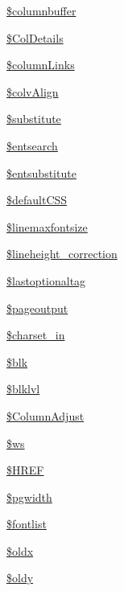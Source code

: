 \begin{DoxyCompactItemize}
\hyperlink{classm_p_d_f_aabfc100308c40e12ebfdd24c4d60b424}{\$columnbuffer}
\item 
\hyperlink{classm_p_d_f_aeceaca485aaacc2226164eaa7629f0f0}{\$\-Col\-Details}
\item 
\hyperlink{classm_p_d_f_abc960dbe6def3255555b6f5072913ca0}{\$column\-Links}
\item 
\hyperlink{classm_p_d_f_a6cedada26bd3250dc7f8cb423c334ad8}{\$colv\-Align}
\item 
\hyperlink{classm_p_d_f_a789074c2445c7038cec974aee6edf46f}{\$substitute}
\item 
\hyperlink{classm_p_d_f_a137d9e105addfbc0051b98e6b49603b7}{\$entsearch}
\item 
\hyperlink{classm_p_d_f_a619915d7aa3f072d3de1ca8ea5a912e3}{\$entsubstitute}
\item 
\hyperlink{classm_p_d_f_acb715c73bf9392442e51b3776bc83dc0}{\$default\-C\-S\-S}
\item 
\hyperlink{classm_p_d_f_a77f6a729dae7f7cc778427e45113b40b}{\$linemaxfontsize}
\item 
\hyperlink{classm_p_d_f_a57c57171287efccba72f73dcc55e02e2}{\$lineheight\-\_\-correction}
\item 
\hyperlink{classm_p_d_f_aa689ef8307ff92c40324b87d0ad8067f}{\$lastoptionaltag}
\item 
\hyperlink{classm_p_d_f_ade5f2b7b3c4ec3deff44358c6ab7fede}{\$pageoutput}
\item 
\hyperlink{classm_p_d_f_af08ee0954b3972836f20c937c027b1f9}{\$charset\-\_\-in}
\item 
\hyperlink{classm_p_d_f_a02ce9503043f4b5527c0c0331f15a8ce}{\$blk}
\item 
\hyperlink{classm_p_d_f_a26838ab1574182eb942f1f785b0ff3e9}{\$blklvl}
\item 
\hyperlink{classm_p_d_f_a8d5c600f88762ee88b2bf044241c36a9}{\$\-Column\-Adjust}
\item 
\hyperlink{classm_p_d_f_a91b8aeed5de9540eda4c82acc3d5737c}{\$ws}
\item 
\hyperlink{classm_p_d_f_af733c43571e0320a064d669903ecd89f}{\$\-H\-R\-E\-F}
\item 
\hyperlink{classm_p_d_f_a54dd5e4b7e26ecdc8789b710ba7f8fd4}{\$pgwidth}
\item 
\hyperlink{classm_p_d_f_ab666dc139f5ef2e951276a93d7a12faf}{\$fontlist}
\item 
\hyperlink{classm_p_d_f_a7db24b80bec847328647f7a0f8a62e7c}{\$oldx}
\item 
\hyperlink{classm_p_d_f_a95fa1ff9d4a3711e22cad03d60c06d39}{\$oldy}

\end{DoxyCompactItemize}
